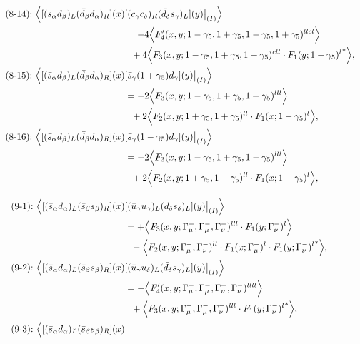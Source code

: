 \begin{align}
\\
\mbox{(8-14):}\ 
\Big\langle
[(\bar s_\alpha d_\beta)_L(\bar d_\beta d_\alpha)_R](x)&
[(\bar c_\gamma c_\delta)_R(\bar d_\delta s_\gamma)_L](y)\big|_{(I)}
\Big\rangle
\notag\\*
&=
-4\Big\langle F_4'(x,y;1-\gamma_5,1+\gamma_5,1-\gamma_5,1+\gamma_5)^{llcl}\Big\rangle
\notag\\*&\ \ 
 + 4\Big\langle F_3(x,y;1-\gamma_5,1+\gamma_5,1+\gamma_5)^{cll} \cdot {F_1(y;1-\gamma_5)^l}^*\Big\rangle,
\\
\mbox{(8-15):}\ 
\Big\langle
[(\bar s_\alpha d_\beta)_L(\bar d_\beta d_\alpha)_R](x)&
[\bar s_\gamma (1 + \gamma_5) d_\gamma](y)\big|_{(I)}
\Big\rangle
\notag\\*
&=
-2\Big\langle F_3(x,y;1-\gamma_5,1+\gamma_5,1+\gamma_5)^{lll}\Big\rangle
\notag\\*&\ \ 
 + 2\Big\langle F_2(x,y;1+\gamma_5,1+\gamma_5)^{ll} \cdot F_1(x;1-\gamma_5)^l\Big\rangle,
\\
\mbox{(8-16):}\ 
\Big\langle
[(\bar s_\alpha d_\beta)_L(\bar d_\beta d_\alpha)_R](x)&
[\bar s_\gamma (1 - \gamma_5) d_\gamma](y)\big|_{(I)}
\Big\rangle
\notag\\*
&=
-2\Big\langle F_3(x,y;1-\gamma_5,1+\gamma_5,1-\gamma_5)^{lll}\Big\rangle
\notag\\*&\ \ 
 + 2\Big\langle F_2(x,y;1+\gamma_5,1-\gamma_5)^{ll} \cdot F_1(x;1-\gamma_5)^l\Big\rangle,
\\[3mm]
\mbox{(9-1):}\ 
\Big\langle
[(\bar s_\alpha d_\alpha)_L(\bar s_\beta s_\beta)_R](x)&
[(\bar u_\gamma u_\gamma)_L(\bar d_\delta s_\delta)_L](y)\big|_{(I)}
\Big\rangle
\notag\\*
&=
 + \Big\langle F_3(x,y;\Gamma_\mu^+,\Gamma_\mu^-,\Gamma_\nu^-)^{lll} \cdot F_1(y;\Gamma_\nu^-)^l\Big\rangle
\notag\\*&\ \ 
 - \Big\langle F_2(x,y;\Gamma_\mu^-,\Gamma_\nu^-)^{ll} \cdot F_1(x;\Gamma_\mu^-)^l \cdot {F_1(y;\Gamma_\nu^-)^l}^*\Big\rangle,
\\
\mbox{(9-2):}\ 
\Big\langle
[(\bar s_\alpha d_\alpha)_L(\bar s_\beta s_\beta)_R](x)&
[(\bar u_\gamma u_\delta)_L(\bar d_\delta s_\gamma)_L](y)\big|_{(I)}
\Big\rangle
\notag\\*
&=
 - \Big\langle F_4'(x,y;\Gamma_\mu^-,\Gamma_\mu^-,\Gamma_\nu^+,\Gamma_\nu^-)^{llll}\Big\rangle
\notag\\*&\ \ 
 + \Big\langle F_3(x,y;\Gamma_\mu^-,\Gamma_\mu^-,\Gamma_\nu^-)^{lll} \cdot {F_1(y;\Gamma_\nu^-)^l}^*\Big\rangle,
\\
\mbox{(9-3):}\ 
\Big\langle
[(\bar s_\alpha d_\alpha)_L(\bar s_\beta s_\beta)_R](x)&

\end{align}
